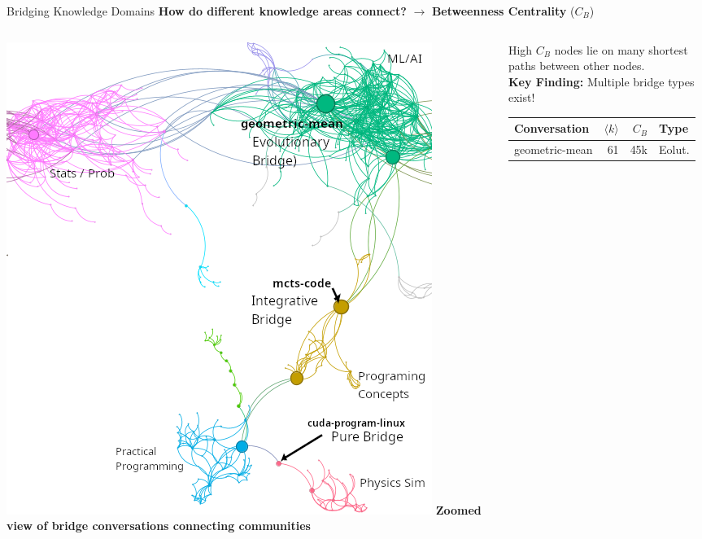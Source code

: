 \documentclass[nodes]{beamer}
\begin{document}
\begin{frame}{Bridging Knowledge Domains}
  \textbf{How do different knowledge areas connect?} $\rightarrow$ \textbf{Betweenness Centrality} ($C_B$)
  \begin{columns}[T]
    \begin{column}{0.55\textwidth}
      \includegraphics[width=\linewidth]{images/bridge-better.png}
      \scriptsize \textbf{Zoomed view of bridge conversations connecting communities}
    \end{column}
    \begin{column}{0.45\textwidth}
      \scriptsize High $C_B$ nodes lie on many shortest paths between other nodes.\\
      \vspace{0.1cm}
      \textbf{Key Finding:} Multiple bridge types exist!
      \begin{tabular}{lrrl}
        \toprule
        \textbf{Conversation} & $\langle k \rangle$ & \textbf{$C_B$} & \textbf{Type} \\
        \midrule
        \scriptsize geometric-mean & 61 & 45k & Eolut. \\

\end{tabular}
\end{column}
\end{columns}
\end{frame}
\end{document}
